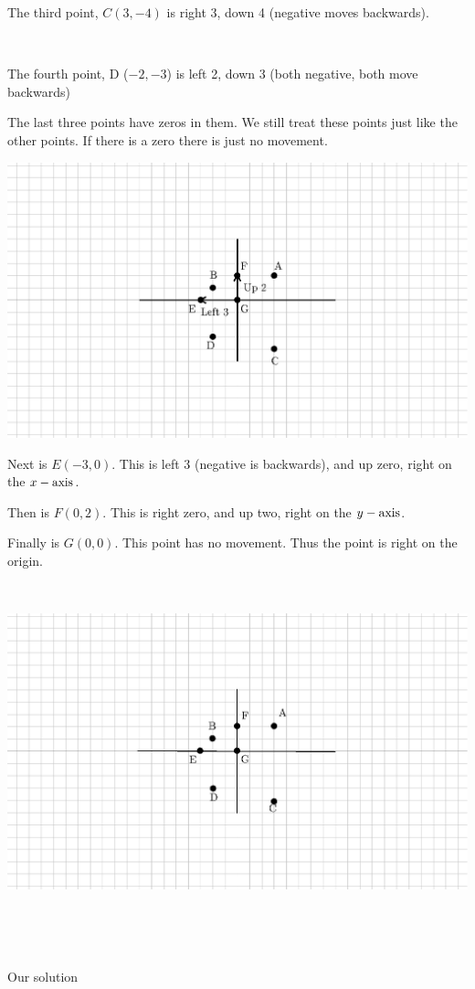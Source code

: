 \begin{example}
\begin{multicols}{2}
     The third point, $C (3, - 4)$ is right 3, down 4 (negative moves
    backwards).
    
    \
    
     The fourth point, D ($- 2, - 3$) is left 2, down 3 (both negative, both
    move backwards)
  \end{multicols}
  
   The last three points have zeros in them. We still treat these points just
  like the other points. If there is a zero there is just no movement.
  
  \begin{multicols}{2}
    \includegraphics[scale=.9,bb = 115 65 310 190, clip=true]{II_1_3b-5.eps}
    
     Next is $E (- 3, 0)$. This is left 3 (negative is backwards), and up zero,
    right on the $x - \operatorname{axis}$.
    
     Then is $F (0, 2)$. This is right zero, and up two, right on the $y -
    \operatorname{axis}$.
    
     Finally is $G (0, 0)$. This point has no movement. Thus the point is right
    on the origin.
  \end{multicols}
  
  \
  
  \begin{multicols}{2}
    \includegraphics[scale=.9,bb = 115 65 310 190, clip=true]{II_1_3b-6.eps}
    
    \
    
    \
    
     Our solution
  \end{multicols}
\end{example}